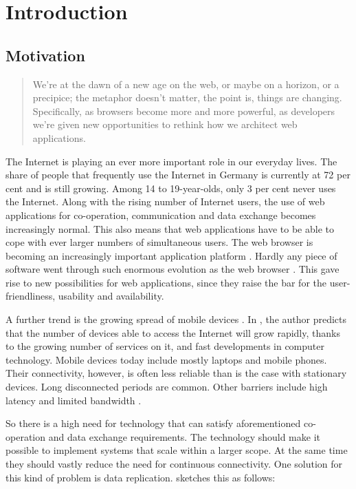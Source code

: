 \chapter{Introduction}


\section{Motivation}
\label{sec:motivation}


\begin{quote}
We're at the dawn of a new age on the web, or maybe on a horizon, or a precipice; the metaphor doesn't matter, the point is, things are changing. Specifically, as browsers become more and more powerful, as developers we're given new opportunities to rethink how we architect web applications. 
\cite{web:architecture}
\end{quote}

The Internet is playing an ever more important role in our everyday lives. The share of people that frequently use the Internet in Germany is currently at 72 per cent and is still growing. Among 14 to 19-year-olds, only 3 per cent  never uses the Internet. Along with the rising number of Internet users, the use of web applications for co-operation, communication and data exchange becomes increasingly normal. This also means that web applications have to be able to cope with ever larger numbers of simultaneous users. The web browser is becoming an increasingly important application platform . Hardly any piece of software went through such enormous evolution as the web browser . This gave rise to new possibilities for web applications, since they raise the bar for the user-friendliness, usability and availability.

A further trend is the growing spread of mobile devices . In , the author predicts that the number of devices able to access the Internet will grow rapidly, thanks to the growing number of services on it, and fast developments in computer technology. Mobile devices today include mostly laptops and mobile phones. Their connectivity, however, is often less reliable than is the case with stationary devices. Long disconnected periods are common. Other barriers include high latency and limited bandwidth .

So there is a high need for technology that can satisfy aforementioned co-operation and data exchange requirements. The technology should make it possible to implement systems that scale within a larger scope. At the same time they should vastly reduce the need for continuous connectivity. One solution for this kind of problem is data replication.  sketches this as follows:

